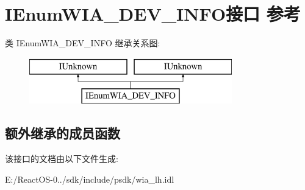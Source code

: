 \hypertarget{interface_i_enum_w_i_a___d_e_v___i_n_f_o}{}\section{I\+Enum\+W\+I\+A\+\_\+\+D\+E\+V\+\_\+\+I\+N\+F\+O接口 参考}
\label{interface_i_enum_w_i_a___d_e_v___i_n_f_o}
类 I\+Enum\+W\+I\+A\+\_\+\+D\+E\+V\+\_\+\+I\+N\+FO 继承关系图\+:\begin{figure}[H]
\begin{center}
\leavevmode
\includegraphics[height=2.000000cm]{interface_i_enum_w_i_a___d_e_v___i_n_f_o}
\end{center}
\end{figure}
\subsection*{额外继承的成员函数}


该接口的文档由以下文件生成\+:\begin{DoxyCompactItemize}
\item 
E\+:/\+React\+O\+S-\/0../sdk/include/psdk/wia\+\_\+lh.\+idl\end{DoxyCompactItemize}

